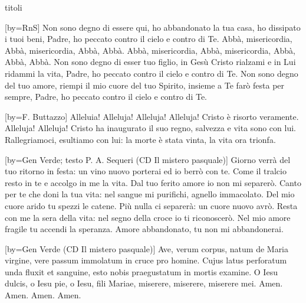 \begin{songs}{titoli}

[by={RnS}]
\beginverse
Non sono degno di essere qui, ho abbandonato la tua casa,
ho dissipato i tuoi beni,
Padre, ho peccato contro il cielo e contro di Te.
\endverse
\beginchorus
Abbà, misericordia, Abbà, misericordia, Abbà, Abbà.
Abbà, misericordia, Abbà, misericordia, Abbà, Abbà, Abbà.
\endchorus
\beginverse
Non sono degno di esser tuo figlio, in Gesù Cristo rialzami
e in Lui ridammi la vita,
Padre, ho peccato contro il cielo e contro di Te.
\endverse
\beginverse
Non sono degno del tuo amore, riempi il mio cuore del tuo Spirito,
insieme a Te farò festa per sempre,
Padre, ho peccato contro il cielo e contro di Te.
\endverse
\endsong

[by={F. Buttazzo}]
\beginchorus
Alleluia! Alleluja! Alleluja! Alleluja!
Cristo è risorto veramente. Alleluja! Alleluja! 
\endchorus
\beginverse
Cristo ha inaugurato il suo regno,
salvezza e vita sono con lui.
Rallegriamoci, esultiamo con lui:
la morte è stata vinta, la vita ora trionfa.
\endverse
\endsong

[by={Gen Verde; testo P. A. Sequeri (CD Il mistero pasquale)}]
\beginverse
Giorno verrà
del tuo ritorno in festa:
un vino nuovo porterai
ed io berrò con te.
Come il tralcio resto in te
e accolgo in me la vita.
Dal tuo ferito amore io
non mi separerò.
\endverse
\beginverse
Canto per te
che doni la tua vita:
nel sangue mi purifichi,
agnello immacolato.
Del mio cuore arido
tu spezzi le catene.
Più nulla ci separerà:
un cuore nuovo avrò.
\endverse
\beginverse
Resta con me
la sera della vita:
nel segno della croce io
ti riconoscerò.
Nel mio amore fragile
tu accendi la speranza.
Amore abbandonato, tu
non mi abbandonerai.
\endverse
\endsong

[by={Gen Verde (CD Il mistero pasquale)}]
\beginchorus
Ave, verum corpus,
natum de Maria virgine,
vere passum immolatum
in cruce pro homine.
Cujus latus perforatum
unda fluxit et sanguine,
esto nobis praegustatum
in mortis examine.
O Iesu dulcis, o Iesu pie,
o Iesu, fili Mariae,
miserere, miserere, miserere mei.
\endchorus
\beginverse*
Amen. Amen. Amen. Amen.
\endverse
\endsong


\end{songs}
